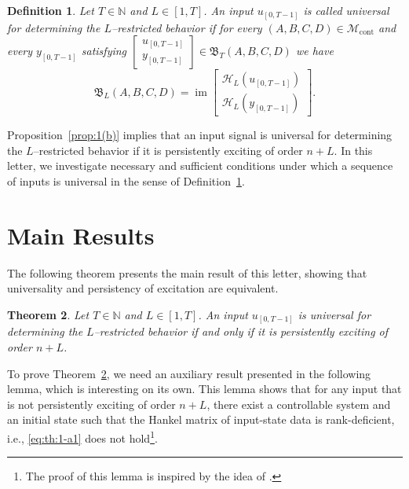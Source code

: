 \documentclass[journal,twoside,web]{ieeecolor}
\newtheorem{theorem}{Theorem}
\newtheorem{definition}[theorem]{Definition}
\DeclareMathOperator{\im}{im}
\begin{document}
\begin{definition}
\label{def:1}
Let $T\in\mathbb{N}$ and $L\in[1,T]$. An input  $u_{[0,T-1]}$ is called \emph{universal for determining the $L$--restricted behavior} if for every $(A,B,C,D)\in\mathcal{M}_\text{cont}$ and every $y_{[0,T-1]}$ satisfying $\begin{bmatrix}
u_{[0,T-1]} \\ y_{[0,T-1]}
\end{bmatrix}\in\mathfrak{B}_T(A,B,C,D)$ we have 
\begin{equation}
\mathfrak{B}_L(A,B,C,D)=\im \begin{bmatrix}
\mathcal{H}_L(u_{[0,T-1]}) \\
\mathcal{H}_L(y_{[0,T-1]}) 
\end{bmatrix}.
\end{equation}
\end{definition}\vspace{0.25 cm}

Proposition~\ref{prop:1(b)} implies that an input signal is universal for determining the $L$--restricted behavior if it is persistently exciting of order $n+L$. In this letter, we investigate necessary and sufficient conditions under which a sequence of inputs is universal in the sense of Definition~\ref{def:1}.

\section{Main Results}
\label{sec:III}

The following theorem presents the main result of this letter, showing that universality and persistency of excitation are equivalent.

\begin{theorem}
\label{th:2}
Let $T\in\mathbb{N}$ and $L\in[1,T]$. An input $u_{[0,T-1]}$ is universal for determining the $L$--restricted behavior \emph{if and only if} it is persistently exciting of order $n+L$.  
\end{theorem}

To prove Theorem~\ref{th:2}, we need an auxiliary result presented in the following lemma, which is interesting on its own. This lemma shows that for any input that is not persistently exciting of order $n+L$, there exist a controllable system and an initial state such that the Hankel matrix of input-state data is rank-deficient, i.e., \eqref{eq:th:1-a1} does not hold\footnote{The proof of this lemma is inspired by the idea of \cite[Lem. 24]{camlibel2024beyond}.}. 
\end{document}
